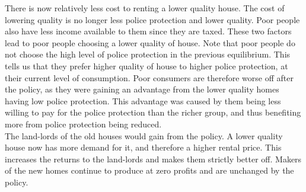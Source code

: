 \documentclass[12pt]{paper}
\begin{document}
There is now relatively less cost to renting a lower quality
house. The cost of lowering quality is no longer less police
protection and lower quality. Poor people also have less income
available to them since they are taxed. These two factors lead to poor
people choosing a lower quality of house. Note that poor people do not
choose the high level of police protection in the previous
equilibrium. This tells us that they prefer higher quality of house to
higher police protection, at their current level of consumption. Poor
consumers are therefore worse off after the policy, as they were
gaining an advantage from the lower quality homes having low police
protection. This advantage was caused by them being less willing to
pay for the police protection than the richer group, and thus
benefiting more from police protection being reduced.
\\

The land-lords of the old houses would gain from the policy. A lower
quality house now has more demand for it, and therefore a higher
rental price. This increases the returns to the land-lords and makes
them strictly better off. Makers of the new homes continue to produce
at zero profits and are unchanged by the policy.
\end{document}
